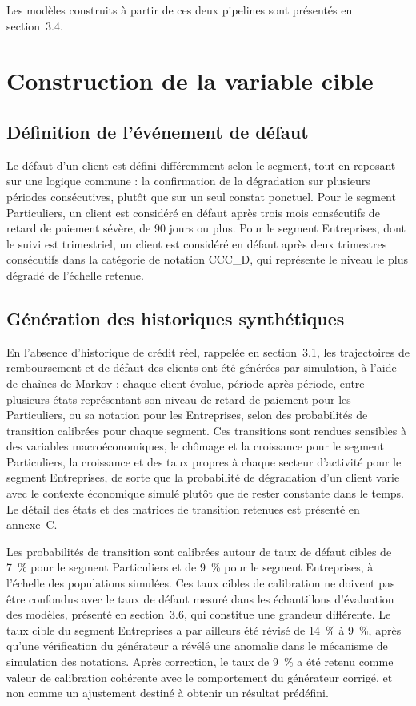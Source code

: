 Les modèles construits à partir de ces deux pipelines sont présentés en section~3.4.

\section{Construction de la variable cible}

\subsection{Définition de l'événement de défaut}

Le défaut d'un client est défini différemment selon le segment, tout en reposant sur une logique commune : la confirmation de la dégradation sur plusieurs périodes consécutives, plutôt que sur un seul constat ponctuel. Pour le segment Particuliers, un client est considéré en défaut après trois mois consécutifs de retard de paiement sévère, de 90 jours ou plus. Pour le segment Entreprises, dont le suivi est trimestriel, un client est considéré en défaut après deux trimestres consécutifs dans la catégorie de notation CCC\_D, qui représente le niveau le plus dégradé de l'échelle retenue.

\subsection{Génération des historiques synthétiques}

En l'absence d'historique de crédit réel, rappelée en section~3.1, les trajectoires de remboursement et de défaut des clients ont été générées par simulation, à l'aide de chaînes de Markov : chaque client évolue, période après période, entre plusieurs états représentant son niveau de retard de paiement pour les Particuliers, ou sa notation pour les Entreprises, selon des probabilités de transition calibrées pour chaque segment. Ces transitions sont rendues sensibles à des variables macroéconomiques, le chômage et la croissance pour le segment Particuliers, la croissance et des taux propres à chaque secteur d'activité pour le segment Entreprises, de sorte que la probabilité de dégradation d'un client varie avec le contexte économique simulé plutôt que de rester constante dans le temps. Le détail des états et des matrices de transition retenues est présenté en annexe~C.

Les probabilités de transition sont calibrées autour de taux de défaut cibles de 7~\% pour le segment Particuliers et de 9~\% pour le segment Entreprises, à l'échelle des populations simulées. Ces taux cibles de calibration ne doivent pas être confondus avec le taux de défaut mesuré dans les échantillons d'évaluation des modèles, présenté en section~3.6, qui constitue une grandeur différente. Le taux cible du segment Entreprises a par ailleurs été révisé de 14~\% à 9~\%, après qu'une vérification du générateur a révélé une anomalie dans le mécanisme de simulation des notations. Après correction, le taux de 9~\% a été retenu comme valeur de calibration cohérente avec le comportement du générateur corrigé, et non comme un ajustement destiné à obtenir un résultat prédéfini.

